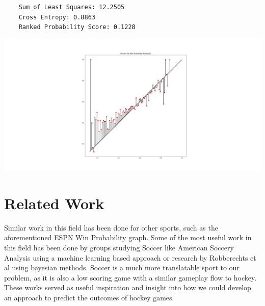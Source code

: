 \documentclass{article}
\begin{document}
\begin{minipage}{0.45\textwidth}
  \vspace*{0pt}
  \centering
  \begin{verbatim}
    Sum of Least Squares: 12.2505
    Cross Entropy: 0.8863
    Ranked Probability Score: 0.1228
  \end{verbatim}
  \end{minipage}
  \hfill
  \begin{minipage}{0.45\textwidth}
  \includegraphics[width=2\textwidth]{elo_residuals.png}\\

\end{minipage}
  


\section{Related Work}
Similar work in this field has been done for other sports, such as the aforementioned ESPN Win Probability graph.
Some of the most useful work in this field has been done by groups studying Soccer like American Soccery Analysis using a 
machine learning based approach \cite{richardett} or research by Robberechts et al \cite{bayesian} using bayesian methods. Soccer
is a much more translatable sport to our problem, as it is also a low scoring game with a similar gameplay flow to hockey.
These works served as useful inspiration and insight into how we could develop an approach to predict the outcomes of hockey games.

\nocite{*}


\end{document}

